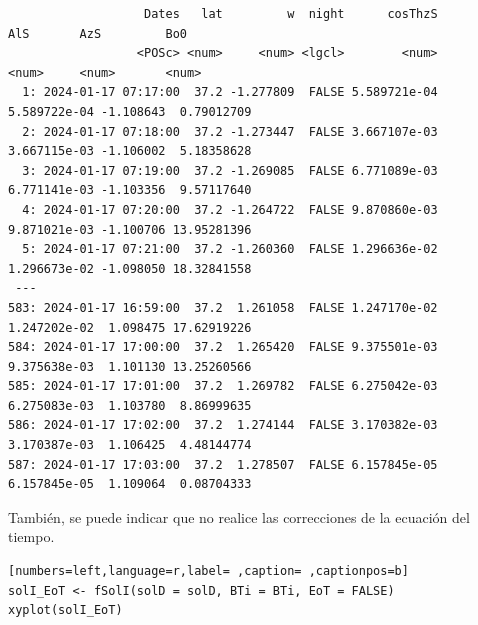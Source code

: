 \begin{verbatim}
                   Dates   lat         w  night      cosThzS          AlS       AzS         Bo0
                  <POSc> <num>     <num> <lgcl>        <num>        <num>     <num>       <num>
  1: 2024-01-17 07:17:00  37.2 -1.277809  FALSE 5.589721e-04 5.589722e-04 -1.108643  0.79012709
  2: 2024-01-17 07:18:00  37.2 -1.273447  FALSE 3.667107e-03 3.667115e-03 -1.106002  5.18358628
  3: 2024-01-17 07:19:00  37.2 -1.269085  FALSE 6.771089e-03 6.771141e-03 -1.103356  9.57117640
  4: 2024-01-17 07:20:00  37.2 -1.264722  FALSE 9.870860e-03 9.871021e-03 -1.100706 13.95281396
  5: 2024-01-17 07:21:00  37.2 -1.260360  FALSE 1.296636e-02 1.296673e-02 -1.098050 18.32841558
 ---                                                                                           
583: 2024-01-17 16:59:00  37.2  1.261058  FALSE 1.247170e-02 1.247202e-02  1.098475 17.62919226
584: 2024-01-17 17:00:00  37.2  1.265420  FALSE 9.375501e-03 9.375638e-03  1.101130 13.25260566
585: 2024-01-17 17:01:00  37.2  1.269782  FALSE 6.275042e-03 6.275083e-03  1.103780  8.86999635
586: 2024-01-17 17:02:00  37.2  1.274144  FALSE 3.170382e-03 3.170387e-03  1.106425  4.48144774
587: 2024-01-17 17:03:00  37.2  1.278507  FALSE 6.157845e-05 6.157845e-05  1.109064  0.08704333
\end{verbatim}

También, se puede indicar que no realice las correcciones de la ecuación del tiempo.
\begin{lstlisting}[numbers=left,language=r,label= ,caption= ,captionpos=b]
solI_EoT <- fSolI(solD = solD, BTi = BTi, EoT = FALSE)
xyplot(solI_EoT)
\end{lstlisting}

